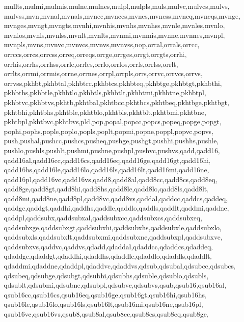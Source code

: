 {{      mullts,mulmi,mulmis,mulne,mulnes,mulpl,mulpls,muls,mulvc,mulvcs,mulvs,  %
      mulvss,mvn,mvnal,mvnals,mvncc,mvnccs,mvncs,mvncss,mvneq,mvneqs,mvnge,   %
      mvnges,mvngt,mvngts,mvnhi,mvnhis,mvnhs,mvnhss,mvnle,mvnles,mvnlo,       %
      mvnlos,mvnls,mvnlss,mvnlt,mvnlts,mvnmi,mvnmis,mvnne,mvnnes,mvnpl,       %
      mvnpls,mvns,mvnvc,mvnvcs,mvnvs,mvnvss,nop,orral,orrals,orrcc,       %
      orrccs,orrcs,orrcss,orreq,orreqs,orrge,orrges,orrgt,orrgts,orrhi,       %
      orrhis,orrhs,orrhss,orrle,orrles,orrlo,orrlos,orrls,orrlss,orrlt,       %
      orrlts,orrmi,orrmis,orrne,orrnes,orrpl,orrpls,orrs,orrvc,orrvcs,orrvs,  %
      orrvss,pkhbt,pkhbtal,pkhbtcc,pkhbtcs,pkhbteq,pkhbtge,pkhbtgt,pkhbthi,   %
      pkhbths,pkhbtle,pkhbtlo,pkhbtls,pkhbtlt,pkhbtmi,pkhbtne,pkhbtpl,        %
      pkhbtvc,pkhbtvs,pkhtb,pkhtbal,pkhtbcc,pkhtbcs,pkhtbeq,pkhtbge,pkhtbgt,  %
      pkhtbhi,pkhtbhs,pkhtble,pkhtblo,pkhtbls,pkhtblt,pkhtbmi,pkhtbne,        %
      pkhtbpl,pkhtbvc,pkhtbvs,pld,pop,popal,popcc,popcs,popeq,popge,popgt,    %
      pophi,pophs,pople,poplo,popls,poplt,popmi,popne,poppl,popvc,popvs,      %
      push,pushal,pushcc,pushcs,pusheq,pushge,pushgt,pushhi,pushhs,pushle,    %
      pushlo,pushls,pushlt,pushmi,pushne,pushpl,pushvc,pushvs,qadd,qadd16,    %
      qadd16al,qadd16cc,qadd16cs,qadd16eq,qadd16ge,qadd16gt,qadd16hi,         %
      qadd16hs,qadd16le,qadd16lo,qadd16ls,qadd16lt,qadd16mi,qadd16ne,         %
      qadd16pl,qadd16vc,qadd16vs,qadd8,qadd8al,qadd8cc,qadd8cs,qadd8eq,       %
      qadd8ge,qadd8gt,qadd8hi,qadd8hs,qadd8le,qadd8lo,qadd8ls,qadd8lt,        %
      qadd8mi,qadd8ne,qadd8pl,qadd8vc,qadd8vs,qaddal,qaddcc,qaddcs,qaddeq,    %
      qaddge,qaddgt,qaddhi,qaddhs,qaddle,qaddlo,qaddls,qaddlt,qaddmi,qaddne,  %
      qaddpl,qaddsubx,qaddsubxal,qaddsubxcc,qaddsubxcs,qaddsubxeq,            %
      qaddsubxge,qaddsubxgt,qaddsubxhi,qaddsubxhs,qaddsubxle,qaddsubxlo,      %
      qaddsubxls,qaddsubxlt,qaddsubxmi,qaddsubxne,qaddsubxpl,qaddsubxvc,      %
      qaddsubxvs,qaddvc,qaddvs,qdadd,qdaddal,qdaddcc,qdaddcs,qdaddeq,         %
      qdaddge,qdaddgt,qdaddhi,qdaddhs,qdaddle,qdaddlo,qdaddls,qdaddlt,        %
      qdaddmi,qdaddne,qdaddpl,qdaddvc,qdaddvs,qdsub,qdsubal,qdsubcc,qdsubcs,  %
      qdsubeq,qdsubge,qdsubgt,qdsubhi,qdsubhs,qdsuble,qdsublo,qdsubls,        %
      qdsublt,qdsubmi,qdsubne,qdsubpl,qdsubvc,qdsubvs,qsub,qsub16,qsub16al,   %
      qsub16cc,qsub16cs,qsub16eq,qsub16ge,qsub16gt,qsub16hi,qsub16hs,         %
      qsub16le,qsub16lo,qsub16ls,qsub16lt,qsub16mi,qsub16ne,qsub16pl,         %
      qsub16vc,qsub16vs,qsub8,qsub8al,qsub8cc,qsub8cs,qsub8eq,qsub8ge,        %
}}

